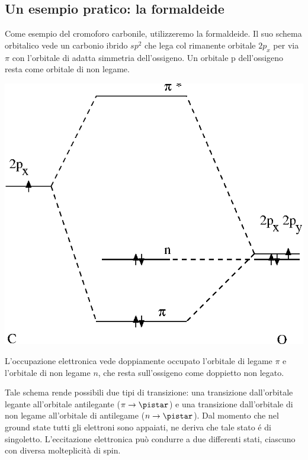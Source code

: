 \subsection{Un esempio pratico: la formaldeide}

Come esempio del cromoforo carbonile, utilizzeremo la formaldeide. Il
suo schema orbitalico vede un carbonio ibrido $sp^2$ che lega col
rimanente orbitale $2p_x$ per via $\pi$ con l'orbitale di adatta
simmetria dell'ossigeno. Un orbitale p dell'ossigeno resta come orbitale
di non legame.
\begin{center}
\vspace{0.3cm}
\includegraphics{../immagini/formaldeide.eps} 
\vspace{0.3cm}
\end{center}

L'occupazione elettronica vede doppiamente occupato l'orbitale di legame
$\pi$ e l'orbitale di non legame $n$, che resta sull'ossigeno come doppietto 
non legato.

Tale schema rende possibili due tipi di transizione: una transizione
dall'orbitale legante all'orbitale antilegante ($ \pi \rightarrow
\pistar $) e una transizione dall'orbitale di non legame all'orbitale di
antilegame ($ n \rightarrow \pistar $). Dal momento che nel ground state
tutti gli elettroni sono appaiati, ne deriva che tale stato \'e di
singoletto. L'eccitazione elettronica pu\`o condurre a due differenti
stati, ciascuno con diversa molteplicit\`a di spin.

